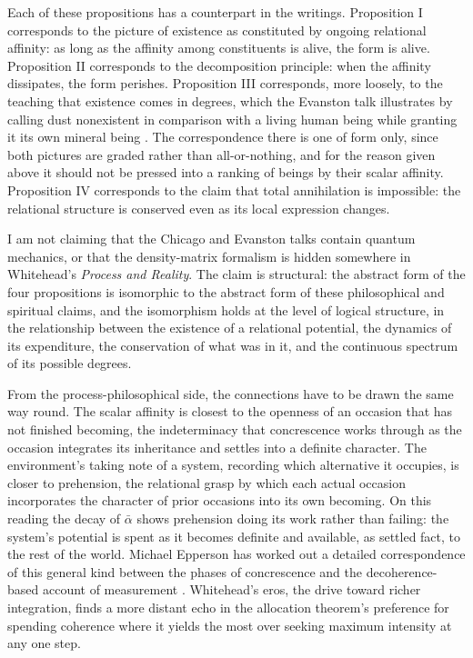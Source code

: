 Each of these propositions has a counterpart in the \bahai writings. Proposition I corresponds to the picture of existence as constituted by ongoing relational affinity: as long as the affinity among constituents is alive, the form is alive. Proposition II corresponds to the decomposition principle: when the affinity dissipates, the form perishes. Proposition III corresponds, more loosely, to the teaching that existence comes in degrees, which the Evanston talk illustrates by calling dust nonexistent in comparison with a living human being while granting it its own mineral being \citep[Talk 38]{PUP}. The correspondence there is one of form only, since both pictures are graded rather than all-or-nothing, and for the reason given above it should not be pressed into a ranking of beings by their scalar affinity. Proposition IV corresponds to the claim that total annihilation is impossible: the relational structure is conserved even as its local expression changes.

I am not claiming that the Chicago and Evanston talks contain quantum mechanics, or that the density-matrix formalism is hidden somewhere in Whitehead's \emph{Process and Reality}. The claim is structural: the abstract form of the four propositions is isomorphic to the abstract form of these philosophical and spiritual claims, and the isomorphism holds at the level of logical structure, in the relationship between the existence of a relational potential, the dynamics of its expenditure, the conservation of what was in it, and the continuous spectrum of its possible degrees.

From the process-philosophical side, the connections have to be drawn the same way round. The scalar affinity is closest to the openness of an occasion that has not finished becoming, the indeterminacy that concrescence works through as the occasion integrates its inheritance and settles into a definite character. The environment's taking note of a system, recording which alternative it occupies, is closer to prehension, the relational grasp by which each actual occasion incorporates the character of prior occasions into its own becoming. On this reading the decay of $\bar{\alpha}$ shows prehension doing its work rather than failing: the system's potential is spent as it becomes definite and available, as settled fact, to the rest of the world. Michael Epperson has worked out a detailed correspondence of this general kind between the phases of concrescence and the decoherence-based account of measurement \citep{Epperson2004}. Whitehead's eros, the drive toward richer integration, finds a more distant echo in the allocation theorem's preference for spending coherence where it yields the most over seeking maximum intensity at any one step.

